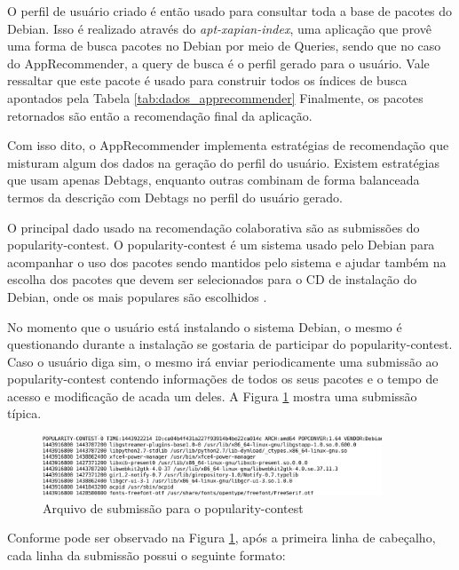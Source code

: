 O perfil de usuário criado é então usado para consultar toda a base de pacotes
do Debian. Isso é realizado através do \textit{apt-xapian-index}, uma aplicação
que provê uma forma de busca pacotes no Debian por meio de Queries, sendo que no
caso do AppRecommender, a query de busca é o perfil gerado para o usuário.
Vale ressaltar que este pacote é usado para construir todos os índices de busca
apontados pela Tabela \ref{tab:dados_apprecommender}
Finalmente, os pacotes retornados são então a recomendação final da aplicação.

Com isso dito, o AppRecommender implementa estratégias de recomendação que
misturam algum dos dados na geração do perfil do usuário. Existem estratégias
que usam apenas Debtags, enquanto outras combinam de forma balanceada termos da
descrição com Debtags no perfil do usuário gerado.



O principal dado usado na recomendação colaborativa são as submissões do
popularity-contest. O popularity-contest é um sistema usado pelo Debian para
acompanhar o uso dos pacotes sendo mantidos pelo sistema e ajudar também na
escolha dos pacotes que devem ser selecionados para o CD de instalação do
Debian, onde os mais populares são escolhidos \cite{araujo2011apprecommender}.

No momento que o usuário está instalando o sistema Debian, o mesmo é
questionando durante a instalação se gostaria de participar do
popularity-contest. Caso o usuário diga sim, o mesmo irá enviar periodicamente
uma submissão ao popularity-contest contendo informações de todos os seus
pacotes e o tempo de acesso e modificação de acada um deles. A Figura
\ref{fig:submissao_popcon} mostra uma submissão típica.

\begin{figure}[h]
  \centering
  \includegraphics[width=0.9\textwidth]{figuras/submissao_popcon.eps}
  \caption{Arquivo de submissão para o popularity-contest}
  \label{fig:submissao_popcon}
\end{figure}

Conforme pode ser observado na Figura \ref{fig:submissao_popcon}, após a
primeira linha de cabeçalho, cada linha da submissão possui o seguinte formato:


